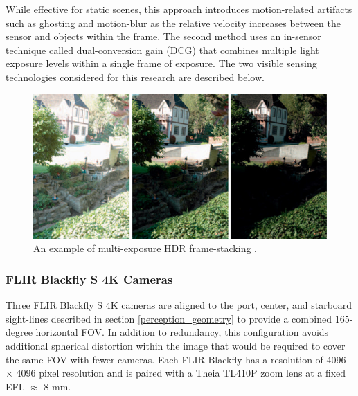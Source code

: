 \documentclass[../main.tex]{subfiles}
\begin{document}
While effective for static scenes, this approach introduces motion-related artifacts such as ghosting and motion-blur as the relative velocity increases between the sensor and objects within the frame.
The second method uses an in-sensor technique called dual-conversion gain (DCG) that combines multiple light exposure levels within a single frame of exposure. 
The two visible sensing technologies considered for this research are described below.

\begin{figure}[htbp]
    \centering
    \includegraphics[width=0.65\linewidth]{Images/hdr_example.png}
    \caption{An example of multi-exposure HDR frame-stacking \cite{Reinhard2010}.}
    \label{fig:hdr_example}
\end{figure}
\subsubsection{FLIR Blackfly S 4K Cameras} \label{sensors_FLIR}

Three FLIR Blackfly S 4K cameras are aligned to the port, center, and starboard sight-lines described in section \ref{perception_geometry} to provide a combined 165-degree horizontal \ac{FOV}.
In addition to redundancy, this configuration avoids additional spherical distortion within the image that would be required to cover the same \ac{FOV} with fewer cameras.
Each FLIR Blackfly has a resolution of 4096 $\times$ 4096 pixel resolution and is paired with a Theia TL410P zoom lens at a fixed \ac{EFL} $\approx$ 8 mm.
\end{document}
